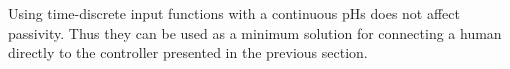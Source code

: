 \documentclass[a4paper,twoside, openright,12pt]{report}
\begin{document}
Using time-discrete input functions with a continuous pHs does not affect passivity. Thus they can be used as a minimum solution for connecting a human directly to the controller presented in the previous section.


\end{document}
